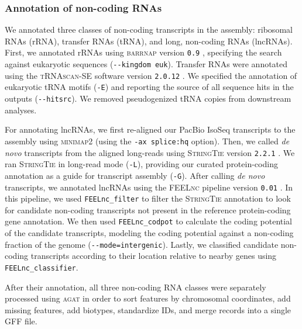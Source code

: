\subsubsection*{Annotation of non-coding RNAs}\label{sec:methods_ncrna}

We annotated three classes of non-coding transcripts in the \bgla{} assembly: ribosomal
RNAs (rRNA), transfer RNAs (tRNA), and long, non-coding RNAs (lncRNAs). First, we annotated
rRNAs using \textsc{barrnap} version \texttt{0.9} \citep{seemann_barrnap_2018}, specifying
the search against eukaryotic sequences (\texttt{-{}-kingdom euk}). Transfer RNAs were
annotated using the \textsc{tRNAscan-SE} software version \texttt{2.0.12}
\citep{chan_trnascan-se_2021}. We specified the annotation of eukaryotic tRNA motifs
(\texttt{-E}) and reporting the source of all sequence hits in the outputs
(\texttt{-{}-hitsrc}). We removed pseudogenized tRNA copies from downstream analyses.
\vspace{0.1cm}

For annotating lncRNAs, we first re-aligned our PacBio IsoSeq transcripts to the
assembly using \textsc{minimap2} (using the \texttt{-ax splice:hq} option). Then, we
called \textit{de novo} transcripts from the aligned long-reads using \textsc{StringTie}
version \texttt{2.2.1} \citep{shumate_improved_2022,kovaka_transcriptome_2019}. We ran
\textsc{StringTie} in long-read mode (\texttt{-L}), providing our curated protein-coding
annotation as a guide for transcript assembly (\texttt{-G}). After calling \textit{de novo}
transcripts, we annotated lncRNAs using the \textsc{FEELnc} pipeline version \texttt{0.01}
\citep{wucher_feelnc_2017}. In this pipeline, we used \texttt{FEELnc\_filter} to filter
the \textsc{StringTie} annotation to look for candidate non-coding transcripts not
present in the reference protein-coding gene annotation. We then used
\texttt{FEELnc\_codpot} to calculate the coding potential of the candidate transcripts,
modeling the coding potential against a non-coding fraction of the genome
(\texttt{-{}-mode=intergenic}). Lastly, we classified candidate non-coding transcripts
according to their location relative to nearby genes using \texttt{FEELnc\_classifier}.
\vspace{0.1cm}

After their annotation, all three non-coding RNA classes were separately processed
using \textsc{agat} in order to sort features by chromosomal coordinates, add
missing features, add biotypes, standardize IDs, and merge records into a single GFF file.

